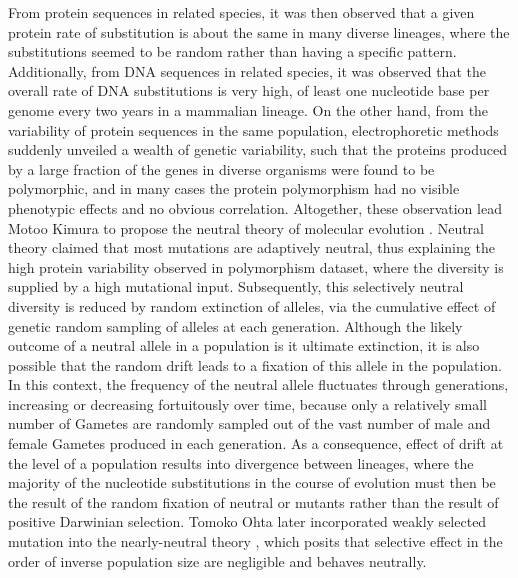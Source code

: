 From protein sequences in related species, it was then observed that a given protein rate of \gls{substitution} is about the same in many diverse lineages, where the \glspl{substitution} seemed to be random rather than having a specific pattern.
Additionally, from \acrshort{DNA} sequences in related species, it was observed that the overall rate of \acrshort{DNA} \glspl{substitution} is very high, of least one nucleotide base per genome every two years in a mammalian lineage.
On the other hand, from the variability of protein sequences in the same population, electrophoretic methods suddenly unveiled a wealth of genetic variability, such that the proteins produced by a large fraction of the genes in diverse organisms were found to be \gls{polymorphic}, and in many cases the protein polymorphism had no visible phenotypic effects and no obvious correlation.
Altogether, these observation lead Motoo Kimura to propose the \gls{neutral} theory of molecular evolution \citep{kimura1968evolutionary,kimura1991neutral,kimura1986dna}.
Neutral theory claimed that most mutations are adaptively \gls{neutral}, thus explaining the high protein variability observed in polymorphism dataset, where the diversity is supplied by a high mutational input.
Subsequently, this selectively \gls{neutral} diversity is reduced by random extinction of \glspl{allele}, via the cumulative effect of genetic random sampling of \glspl{allele} at each generation.
Although the likely outcome of a \gls{neutral} \gls{allele} in a population is it ultimate extinction, it is also possible that the random drift leads to a fixation of this \gls{allele} in the population.
In this context, the frequency of the \gls{neutral} \gls{allele} fluctuates through generations, increasing or decreasing fortuitously over time, because only a relatively small number of \glspl{Gamete} are randomly sampled out of the vast number of male and female \glspl{Gamete} produced in each generation.
As a consequence, effect of \gls{drift} at the level of a population results into divergence between lineages, where the majority of the nucleotide \glspl{substitution} in the course of evolution must then be the result of the random fixation of \gls{neutral} or mutants rather than the result of positive Darwinian selection.
Tomoko Ohta later incorporated weakly selected mutation into the \gls{nearly-neutral} theory \citep{ohta1973slightly}, which posits that selective effect in the order of inverse population size are negligible and behaves neutrally.

